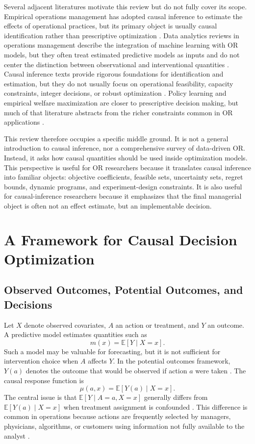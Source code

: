 \documentclass[11pt]{article}
\begin{document}
Several adjacent literatures motivate this review but do not fully cover its scope. Empirical operations management has adopted causal inference to estimate the effects of operational practices, but its primary object is usually causal identification rather than prescriptive optimization \citep{ho2017causal}. Data analytics reviews in operations management describe the integration of machine learning with OR models, but they often treat estimated predictive models as inputs and do not center the distinction between observational and interventional quantities \citep{misic2020data,choi2018bigdata}. Causal inference texts provide rigorous foundations for identification and estimation, but they do not usually focus on operational feasibility, capacity constraints, integer decisions, or robust optimization \citep{imbens2015causal,hernan2020causal,pearl2009causality}. Policy learning and empirical welfare maximization are closer to prescriptive decision making, but much of that literature abstracts from the richer constraints common in OR applications \citep{manski2004statistical,kitagawa2018treated,athey2021policy}.

This review therefore occupies a specific middle ground. It is not a general introduction to causal inference, nor a comprehensive survey of data-driven OR. Instead, it asks how causal quantities should be used inside optimization models. This perspective is useful for OR researchers because it translates causal inference into familiar objects: objective coefficients, feasible sets, uncertainty sets, regret bounds, dynamic programs, and experiment-design constraints. It is also useful for causal-inference researchers because it emphasizes that the final managerial object is often not an effect estimate, but an implementable decision.

\section{A Framework for Causal Decision Optimization}
\label{sec:framework}

\subsection{Observed Outcomes, Potential Outcomes, and Decisions}

Let $X$ denote observed covariates, $A$ an action or treatment, and $Y$ an outcome. A predictive model estimates quantities such as
\[
    m(x)=\mathbb{E}[Y\mid X=x].
\]
Such a model may be valuable for forecasting, but it is not sufficient for intervention choice when $A$ affects $Y$. In the potential outcomes framework, $Y(a)$ denotes the outcome that would be observed if action $a$ were taken \citep{rubin1974estimating,imbens2015causal}. The causal response function is
\[
    \mu(a,x)=\mathbb{E}[Y(a)\mid X=x].
\]
The central issue is that $\mathbb{E}[Y\mid A=a,X=x]$ generally differs from $\mathbb{E}[Y(a)\mid X=x]$ when treatment assignment is confounded \citep{rosenbaum1983central,pearl2009causality,hernan2020causal}. This difference is common in operations because actions are frequently selected by managers, physicians, algorithms, or customers using information not fully available to the analyst \citep{ho2017causal}.
\end{document}
